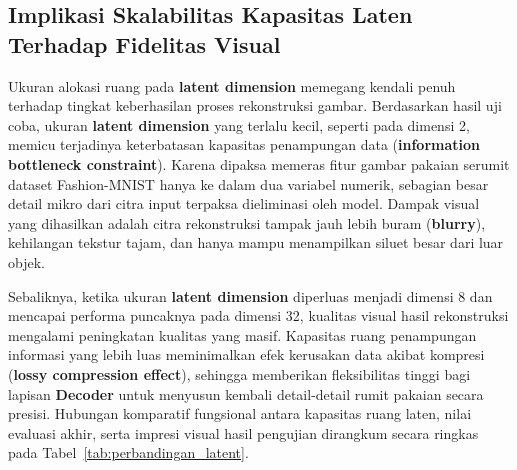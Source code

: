 \documentclass[12pt,titlepage]{article}
\begin{document}
\subsection{Implikasi Skalabilitas Kapasitas Laten Terhadap Fidelitas Visual}
Ukuran alokasi ruang pada \textbf{latent dimension} memegang kendali penuh terhadap tingkat keberhasilan proses rekonstruksi gambar. Berdasarkan hasil uji coba, ukuran \textbf{latent dimension} yang terlalu kecil, seperti pada dimensi 2, memicu terjadinya keterbatasan kapasitas penampungan data (\textbf{information bottleneck constraint}). Karena dipaksa memeras fitur gambar pakaian serumit dataset Fashion-MNIST hanya ke dalam dua variabel numerik, sebagian besar detail mikro dari citra input terpaksa dieliminasi oleh model. Dampak visual yang dihasilkan adalah citra rekonstruksi tampak jauh lebih buram (\textbf{blurry}), kehilangan tekstur tajam, dan hanya mampu menampilkan siluet besar dari luar objek.

Sebaliknya, ketika ukuran \textbf{latent dimension} diperluas menjadi dimensi 8 dan mencapai performa puncaknya pada dimensi 32, kualitas visual hasil rekonstruksi mengalami peningkatan kualitas yang masif. Kapasitas ruang penampungan informasi yang lebih luas meminimalkan efek kerusakan data akibat kompresi (\textbf{lossy compression effect}), sehingga memberikan fleksibilitas tinggi bagi lapisan \textbf{Decoder} untuk menyusun kembali detail-detail rumit pakaian secara presisi. Hubungan komparatif fungsional antara kapasitas ruang laten, nilai evaluasi akhir, serta impresi visual hasil pengujian dirangkum secara ringkas pada Tabel~\ref{tab:perbandingan_latent}.

\begin{table}[htbp]
	\centering
	\caption{Tabel Komparasi Performa dan Kualitas Visual}
	\label{tab:perbandingan_latent}
\end{table}
\end{document}
